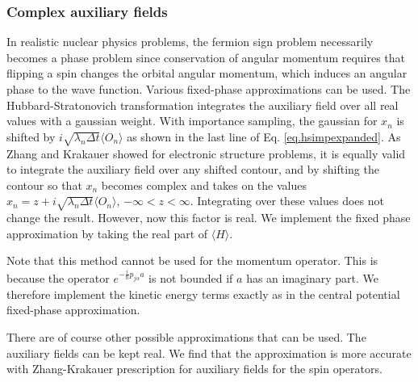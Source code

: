  \subsubsection{Complex auxiliary fields}
 In realistic nuclear physics problems,
 the fermion sign problem necessarily becomes a phase problem
 since conservation of angular momentum requires that flipping a spin changes
 the orbital angular momentum, which induces an angular phase to the wave
 function. Various fixed-phase approximations can be used. The
 Hubbard-Stratonovich transformation integrates the auxiliary field over
 all real values with a gaussian weight. With importance sampling, the
 gaussian for $x_n$ is shifted by $i\sqrt{\lambda_n \Delta t}\langle O_n\rangle$
 as shown in the last line of Eq. \ref{eq.hsimpexpanded}.
 As Zhang and Krakauer\cite{zhang2003} showed for electronic structure problems,
 it is equally valid to integrate the auxiliary field over any shifted
 contour, and by shifting the contour so that $x_n$ becomes complex
 and takes on the values
 $x_n  = z + i\sqrt{\lambda_n \Delta t}\langle O_n\rangle$,
 $-\infty < z < \infty$. Integrating over these values does not change the
 result. However, now this factor is real. We implement the fixed phase
 approximation by taking the real part of $\langle H \rangle$.
 
 
 Note that this method cannot be used for the momentum operator. This is
 because the operator
 $e^{-\frac{i}{\hbar} p_{j\alpha} a}$ is not bounded if $a$ has an imaginary
 part. We therefore implement the kinetic energy terms exactly as in the
 central potential fixed-phase approximation.
 
 There are of course other possible approximations that can be used. The
 auxiliary fields can be kept real. We find that the approximation is
 more accurate with Zhang-Krakauer prescription for auxiliary fields for
 the spin operators.
 
